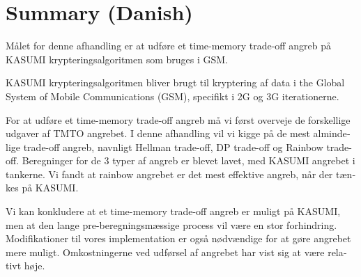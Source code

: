 \chapter{Summary (Danish)}
\begin{otherlanguage}{danish}

Målet for denne afhandling er at udføre et time-memory trade-off
angreb på KASUMI krypteringsalgoritmen som bruges i GSM.

KASUMI krypteringsalgoritmen bliver brugt til kryptering af data i the
Global System of Mobile Communications (GSM), specifikt i 2G og 3G
iterationerne.

For at udføre et time-memory trade-off angreb må vi først overveje
de forskellige udgaver af TMTO angrebet. I denne afhandling vil vi
kigge på de mest almindelige trade-off angreb, navnligt Hellman
trade-off, DP trade-off og Rainbow trade-off. Beregninger for de 3
typer af angreb er blevet lavet, med KASUMI angrebet i tankerne. Vi
fandt at rainbow angrebet er det mest effektive angreb, når der tænkes
på KASUMI.

Vi kan konkludere at et time-memory trade-off angreb er muligt på
KASUMI, men at den lange pre-beregningsmæssige process vil være en
stor forhindring. Modifikationer til vores implementation er også
nødvændige for at gøre angrebet mere muligt. Omkostningerne ved
udførsel af angrebet har vist sig at være relativt høje.

\end{otherlanguage}

